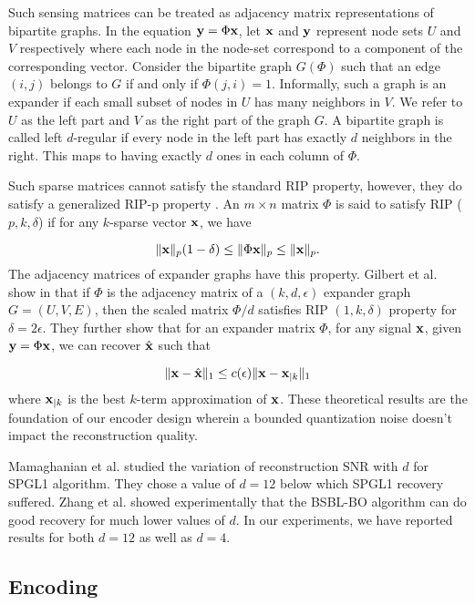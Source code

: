 Such sensing matrices can be treated as adjacency 
matrix representations of bipartite graphs.
In the equation $\mathbf{y} = \Phi \mathbf{x}$, let $\mathbf{x}$
and $\mathbf{y}$ represent node sets $U$ and $V$
respectively where each node in the node-set
correspond to a component of the corresponding vector.
Consider the bipartite graph $G (\Phi)$ such that
an edge $(i, j)$ belongs to $G$ if and only if
$\Phi(j, i) = 1$. Informally, such a graph is
an expander \cite{gilbert2010sparse} if each
small subset of nodes in $U$ has many neighbors
in $V$. We refer to $U$ as the left part and $V$
as the right part of the graph $G$.
A bipartite graph is called left $d$-regular
if every node in the left part has exactly
$d$ neighbors in the right. This maps to having
exactly $d$ ones in each column of $\Phi$.

Such sparse matrices cannot satisfy the standard RIP
property, however, they do satisfy a generalized
RIP-p property \cite{gilbert2010sparse}.
An $m \times n$ matrix $\Phi$ is said to satisfy
RIP ($p, k, \delta$) if for any $k$-sparse vector
$\mathbf{x}$, we have

\begin{equation}
\| \mathbf{x} \|_p (1 - \delta) \leq \| \Phi \mathbf{x} \|_p \leq \| \mathbf{x} \|_p.
\end{equation}
The adjacency matrices of expander graphs have
this property. Gilbert et al. show in \cite{gilbert2010sparse}
that if $\Phi$ is the adjacency matrix of a $(k,d, \epsilon)$
expander graph $G = (U, V, E)$, then the scaled matrix
$\Phi / d$ satisfies RIP $(1,k, \delta)$ property for
$\delta = 2 \epsilon$.
They further show that for an expander matrix $\Phi$,
for any signal $\mathbf{x}$, given $\mathbf{y} = \Phi \mathbf{x}$, we
can recover $\hat{\mathbf{x}}$ such that

$$
\| \mathbf{x} - \hat{\mathbf{x}} \|_1 \leq c(\epsilon) \| \mathbf{x} - \mathbf{x}_{|k} \|_1
$$
where $\mathbf{x}_{|k}$ is the best $k$-term approximation of $\mathbf{x}$.
These theoretical results are the foundation of our encoder
design wherein a bounded quantization noise doesn't impact
the reconstruction quality. 

Mamaghanian et al. \cite{mamaghanian2011compressed}
studied the variation of reconstruction SNR with $d$ for SPGL1
algorithm. They chose a value of $d=12$ below which
SPGL1 recovery suffered. Zhang et al. \cite{zhang2012compressed}
showed experimentally that the BSBL-BO algorithm can do good
recovery for much lower values of $d$.
In our experiments, we have reported results for both $d=12$
as well as $d=4$.


\subsection{Encoding}


